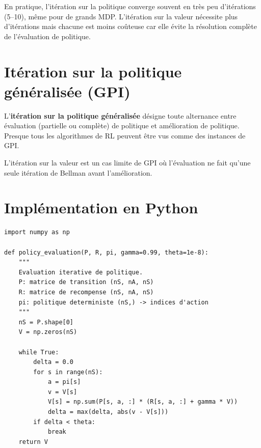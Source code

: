 \begin{remarque}
En pratique, l'it\'eration sur la politique converge souvent en tr\`es peu
d'it\'erations (5--10), m\^eme pour de grands MDP. L'it\'eration sur la valeur
n\'ecessite plus d'it\'erations mais chacune est moins co\^uteuse car elle
\'evite la r\'esolution compl\`ete de l'\'evaluation de politique.
\end{remarque}

\section{It\'eration sur la politique g\'en\'eralis\'ee (GPI)}

\begin{definition}
L'\textbf{it\'eration sur la politique g\'en\'eralis\'ee} d\'esigne toute alternance
entre \'evaluation (partielle ou compl\`ete) de politique et am\'elioration de
politique. Presque tous les algorithmes de RL peuvent \^etre vus comme des
instances de GPI.
\end{definition}

\begin{remarque}
L'it\'eration sur la valeur est un cas limite de GPI o\`u l'\'evaluation ne fait
qu'une seule it\'eration de Bellman avant l'am\'elioration.
\end{remarque}

\section{Impl\'ementation en Python}

\begin{codeblock}[title=\textbf{\'Evaluation de politique}]
\begin{verbatim}
import numpy as np

def policy_evaluation(P, R, pi, gamma=0.99, theta=1e-8):
    """
    Evaluation iterative de politique.
    P: matrice de transition (nS, nA, nS)
    R: matrice de recompense (nS, nA, nS)
    pi: politique deterministe (nS,) -> indices d'action
    """
    nS = P.shape[0]
    V = np.zeros(nS)

    while True:
        delta = 0.0
        for s in range(nS):
            a = pi[s]
            v = V[s]
            V[s] = np.sum(P[s, a, :] * (R[s, a, :] + gamma * V))
            delta = max(delta, abs(v - V[s]))
        if delta < theta:
            break
    return V
\end{verbatim}
\end{codeblock}


